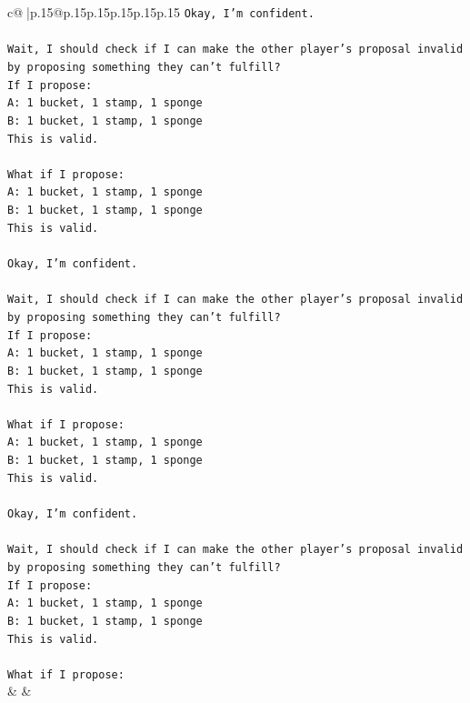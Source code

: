 \documentclass{article}
\begin{document}
{\begin{supertabular}{c@{$\;$}|p{.15\linewidth}@{}p{.15\linewidth}p{.15\linewidth}p{.15\linewidth}p{.15\linewidth}p{.15\linewidth}}
{{{\texttt{Okay, I'm confident.} \\
\\ 
\texttt{Wait, I should check if I can make the other player's proposal invalid by proposing something they can't fulfill?} \\
\texttt{If I propose:} \\
\texttt{A: 1 bucket, 1 stamp, 1 sponge} \\
\texttt{B: 1 bucket, 1 stamp, 1 sponge} \\
\texttt{This is valid.} \\
\\ 
\texttt{What if I propose:} \\
\texttt{A: 1 bucket, 1 stamp, 1 sponge} \\
\texttt{B: 1 bucket, 1 stamp, 1 sponge} \\
\texttt{This is valid.} \\
\\ 
\texttt{Okay, I'm confident.} \\
\\ 
\texttt{Wait, I should check if I can make the other player's proposal invalid by proposing something they can't fulfill?} \\
\texttt{If I propose:} \\
\texttt{A: 1 bucket, 1 stamp, 1 sponge} \\
\texttt{B: 1 bucket, 1 stamp, 1 sponge} \\
\texttt{This is valid.} \\
\\ 
\texttt{What if I propose:} \\
\texttt{A: 1 bucket, 1 stamp, 1 sponge} \\
\texttt{B: 1 bucket, 1 stamp, 1 sponge} \\
\texttt{This is valid.} \\
\\ 
\texttt{Okay, I'm confident.} \\
\\ 
\texttt{Wait, I should check if I can make the other player's proposal invalid by proposing something they can't fulfill?} \\
\texttt{If I propose:} \\
\texttt{A: 1 bucket, 1 stamp, 1 sponge} \\
\texttt{B: 1 bucket, 1 stamp, 1 sponge} \\
\texttt{This is valid.} \\
\\ 
\texttt{What if I propose:} \\
            }
        }
    }
    & & \\ \\


\end{supertabular}}
\end{document}
